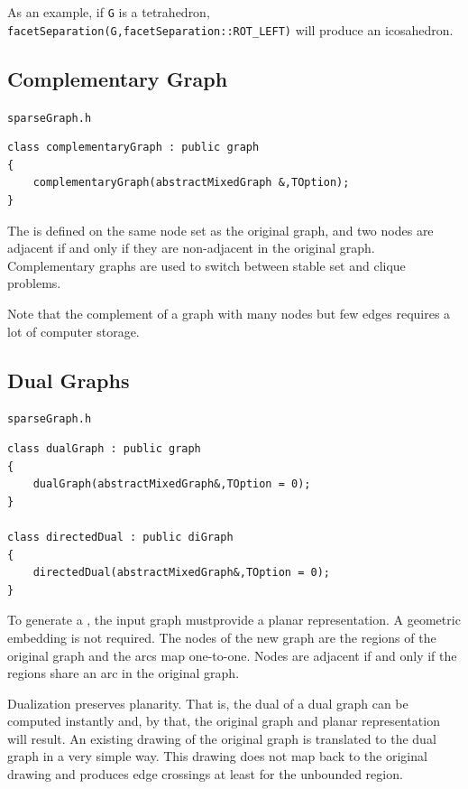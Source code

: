 \documentclass[a4paper,11pt,twoside]{book}
\begin{document}
\begin{multicols}{2}
As an example, if \verb/G/ is a tetrahedron, \verb/facetSeparation(G,facetSeparation::ROT_LEFT)/
will produce an icosahedron.


\subsection{Complementary Graph}
\label{sbl_complementary_graph}
\myinclude\verb/sparseGraph.h/
\begin{mymethods}
\begin{verbatim}
class complementaryGraph : public graph
{
    complementaryGraph(abstractMixedGraph &,TOption);
}
\end{verbatim}
\end{mymethods}
The  is defined on the same node set as the original graph,
and two nodes are adjacent if and only if they are non-adjacent in the original graph.
Complementary graphs are used to switch between stable set and clique problems.

Note that the complement of a graph with many nodes but few edges requires a lot of
computer storage.


\subsection{Dual Graphs}
\label{sbl_dual_graph}
\myinclude\verb/sparseGraph.h/
\begin{mymethods}
\begin{verbatim}
class dualGraph : public graph
{
    dualGraph(abstractMixedGraph&,TOption = 0);
}

class directedDual : public diGraph
{
    directedDual(abstractMixedGraph&,TOption = 0);
}
\end{verbatim}
\end{mymethods}
To generate a , the input graph mustprovide a planar representation.
A geometric embedding is not required. The nodes of the new graph are the regions
of the original graph and the arcs map one-to-one. Nodes are adjacent if and only
if the regions share an arc in the original graph.

Dualization preserves planarity. That is, the dual of a dual graph can be computed
instantly and, by that, the original graph and planar representation will result.
An existing drawing of the original graph is translated to the dual graph in a
very simple way. This drawing does not map back to the original drawing and
produces edge crossings at least for the unbounded region.


\end{multicols}
\end{document}
